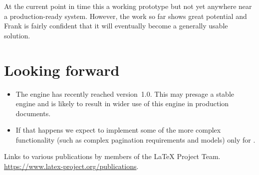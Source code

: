 \documentclass{ltnews}
\begin{document}
At the current point in time this a working prototype but not yet anywhere near
a production-ready system. However, the work so far shows great potential and
Frank is fairly confident that it will eventually become a generally usable
solution.

\section{Looking forward}

\begin{itemize}
  \item The  engine has recently reached version~1.0. This may
    presage a stable  engine and is likely to result in
    wider use of this engine in production documents.
  \item If that happens we expect to implement some of the more complex
    functionality (such as complex pagination requirements and models) only for
    .
\end{itemize}

\begin{thebibliography}{10}
  \raggedright
    Links to various publications by members of the \LaTeX{} Project Team.
    \newblock \url{https://www.latex-project.org/publications}.
\end{thebibliography}
\end{document}
